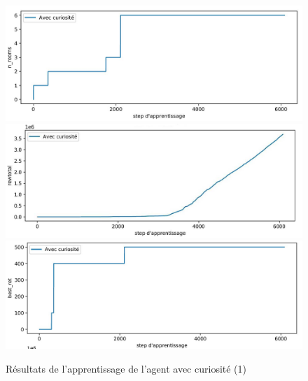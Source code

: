 \documentclass[a4paper,12pt]{report}
\begin{document}
\begin{figure}[H]
    \centering
    \includegraphics[width=\textwidth]{curiosity_only/curiosity_n_rooms.JPG}\\
    \includegraphics[width=\textwidth]{curiosity_only/curiosity_rewtotal.JPG}\\
    \includegraphics[width=\textwidth]{curiosity_only/curiosity_best_ret.JPG}
    \caption{Résultats de l'apprentissage de l'agent avec curiosité (1)}
\end{figure}
\end{document}
